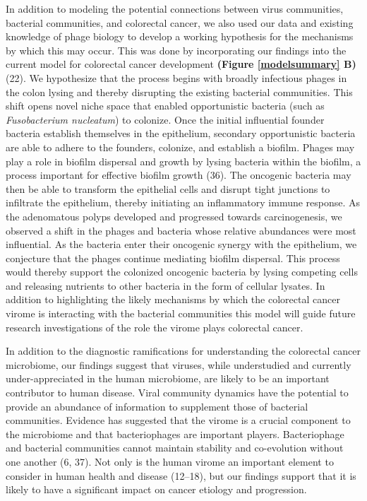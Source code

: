 \documentclass[12pt,]{article}
\begin{document}
In addition to modeling the potential connections between virus
communities, bacterial communities, and colorectal cancer, we also used
our data and existing knowledge of phage biology to develop a working
hypothesis for the mechanisms by which this may occur. This was done by
incorporating our findings into the current model for colorectal cancer
development \textbf{(Figure \ref{modelsummary} B)} (22). We hypothesize
that the process begins with broadly infectious phages in the colon
lysing and thereby disrupting the existing bacterial communities. This
shift opens novel niche space that enabled opportunistic bacteria (such
as \emph{Fusobacterium nucleatum}) to colonize. Once the initial
influential founder bacteria establish themselves in the epithelium,
secondary opportunistic bacteria are able to adhere to the founders,
colonize, and establish a biofilm. Phages may play a role in biofilm
dispersal and growth by lysing bacteria within the biofilm, a process
important for effective biofilm growth (36). The oncogenic bacteria may
then be able to transform the epithelial cells and disrupt tight
junctions to infiltrate the epithelium, thereby initiating an
inflammatory immune response. As the adenomatous polyps developed and
progressed towards carcinogenesis, we observed a shift in the phages and
bacteria whose relative abundances were most influential. As the
bacteria enter their oncogenic synergy with the epithelium, we
conjecture that the phages continue mediating biofilm dispersal. This
process would thereby support the colonized oncogenic bacteria by lysing
competing cells and releasing nutrients to other bacteria in the form of
cellular lysates. In addition to highlighting the likely mechanisms by
which the colorectal cancer virome is interacting with the bacterial
communities this model will guide future research investigations of the
role the virome plays colorectal cancer.

In addition to the diagnostic ramifications for understanding the
colorectal cancer microbiome, our findings suggest that viruses, while
understudied and currently under-appreciated in the human microbiome,
are likely to be an important contributor to human disease. Viral
community dynamics have the potential to provide an abundance of
information to supplement those of bacterial communities. Evidence has
suggested that the virome is a crucial component to the microbiome and
that bacteriophages are important players. Bacteriophage and bacterial
communities cannot maintain stability and co-evolution without one
another (6, 37). Not only is the human virome an important element to
consider in human health and disease (12--18), but our findings support
that it is likely to have a significant impact on cancer etiology and
progression.
\end{document}
